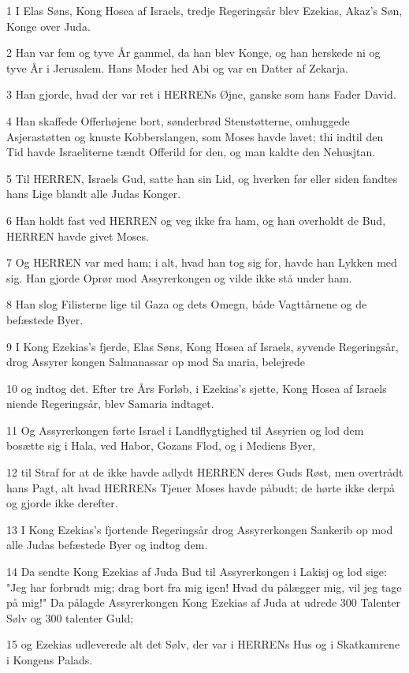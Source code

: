 \par 1 I Elas Søns, Kong Hosea af Israels, tredje Regeringsår blev Ezekias, Akaz's Søn, Konge over Juda.
\par 2 Han var fem og tyve År gammel, da han blev Konge, og han herskede ni og tyve År i Jerusalem. Hans Moder hed Abi og var en Datter af Zekarja.
\par 3 Han gjorde, hvad der var ret i HERRENs Øjne, ganske som hans Fader David.
\par 4 Han skaffede Offerhøjene bort, sønderbrød Stenstøtterne, omhuggede Asjerastøtten og knuste Kobberslangen, som Moses havde lavet; thi indtil den Tid havde Israeliterne tændt Offerild for den, og man kaldte den Nehusjtan.
\par 5 Til HERREN, Israels Gud, satte han sin Lid, og hverken før eller siden fandtes hans Lige blandt alle Judas Konger.
\par 6 Han holdt fast ved HERREN og veg ikke fra ham, og han overholdt de Bud, HERREN havde givet Moses.
\par 7 Og HERREN var med ham; i alt, hvad han tog sig for, havde han Lykken med sig. Han gjorde Oprør mod Assyrerkongen og vilde ikke stå under ham.
\par 8 Han slog Filisterne lige til Gaza og dets Omegn, både Vagttårnene og de befæstede Byer.
\par 9 I Kong Ezekias's fjerde, Elas Søns, Kong Hosea af Israels, syvende Regeringsår, drog Assyrer kongen Salmanassar op mod Sa maria, belejrede
\par 10 og indtog det. Efter tre Års Forløb, i Ezekias's sjette, Kong Hosea af Israels niende Regeringsår, blev Samaria indtaget.
\par 11 Og Assyrerkongen førte Israel i Landflygtighed til Assyrien og lod dem bosætte sig i Hala, ved Habor, Gozans Flod, og i Mediens Byer,
\par 12 til Straf for at de ikke havde adlydt HERREN deres Guds Røst, men overtrådt hans Pagt, alt hvad HERRENs Tjener Moses havde påbudt; de hørte ikke derpå og gjorde ikke derefter.
\par 13 I Kong Ezekias's fjortende Regeringsår drog Assyrerkongen Sankerib op mod alle Judas befæstede Byer og indtog dem.
\par 14 Da sendte Kong Ezekias af Juda Bud til Assyrerkongen i Lakisj og lod sige: "Jeg har forbrudt mig; drag bort fra mig igen! Hvad du pålægger mig, vil jeg tage på mig!" Da pålagde Assyrerkongen Kong Ezekias af Juda at udrede 300 Talenter Sølv og 300 talenter Guld;
\par 15 og Ezekias udleverede alt det Sølv, der var i HERRENs Hus og i Skatkamrene i Kongens Palads.
